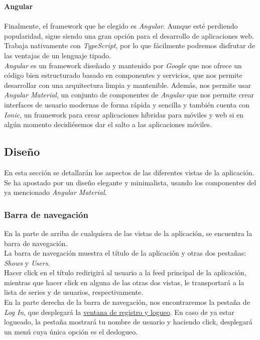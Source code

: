 \noindent \textbf{Angular}\\ \\
\indent Finalmente, el framework que he elegido es \textit{Angular}. Aunque esté perdiendo popularidad, sigue
siendo una gran opción para el desarrollo de aplicaciones web. Trabaja nativamente con \textit{TypeScript}, por lo que
fácilmente podremos disfrutar de las ventajas de un lenguaje tipado.\\

\textit{Angular} es un framework diseñado y mantenido por \textit{Google} que nos ofrece un código bien estructurado
basado en componentes y servicios, que nos permite desarrollar con una arquitectura limpia y mantenible. Además, nos
permite usar \textit{Angular Material}\cite{angularmaterial}, un conjunto de componentes de \textit{Angular} que nos
permite crear interfaces de usuario modernas de forma rápida y sencilla y también cuenta con \textit{Ionic}\cite{ionic},
un framework para crear aplicaciones híbridas para móviles y web si en algún momento decidiésemos dar el salto a las
aplicaciones móviles.\\

\subsection{Diseño}
En esta sección se detallarán los aspectos de las diferentes vistas de la aplicación. Se ha apostado por un diseño
elegante y minimalista, usando los componentes del ya mencionado \textit{Angular Material}.

\subsubsection{Barra de navegación}
En la parte de arriba de cualquiera de las vistas de la aplicación, se encuentra la barra de navegación.\\

La barra de navegación muestra el título de la aplicación y otras dos pestañas: \textit{Shows} y \textit{Users}.\\

Hacer click en el título redirigirá al usuario a la feed principal de la aplicación, mientras que hacer click en
alguna de las otras dos vistas, le transportará a la lista de series y de usuarios, respectivamente.\\

En la parte derecha de la barra de navegación, nos encontraremos la pestaña de \textit{Log In}, que desplegará la
\hyperref[sec:login-signin]{ventana de registro y logueo}. En caso de ya estar logueado, la pestaña mostrará tu nombre de
usuario y haciendo click, desplegará un menú cuya única opción es el deslogueo.\\

